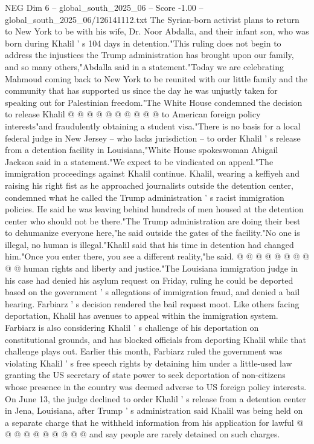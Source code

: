 \begin{textsample}{NEG Dim 6 – global\_south\_2025\_06 – Score -1.00 – global\_south\_2025\_06/126141112.txt}
The Syrian-born activist plans to return to New York to be with his wife, Dr.
Noor Abdalla, and their infant son, who was born during Khalil ' s 104 days in detention."This ruling does not begin to address the injustices the Trump administration has brought upon our family, and so many others,"Abdalla said in a statement."Today we are celebrating Mahmoud coming back to New York to be reunited with our little family and the community that has supported us since the day he was unjustly taken for speaking out for Palestinian freedom."The White House condemned the decision to release Khalil @ @ @ @ @ @ @ @ @ @ to American foreign policy interests"and fraudulently obtaining a student visa."There is no basis for a local federal judge in New Jersey -- who lacks jurisdiction -- to order Khalil ' s release from a detention facility in Louisiana,"White House spokeswoman Abigail Jackson said in a statement."We expect to be vindicated on appeal."The immigration proceedings against Khalil continue.
Khalil, wearing a keffiyeh and raising his right fist as he approached journalists outside the detention center, condemned what he called the Trump administration ' s racist immigration policies.
He said he was leaving behind hundreds of men housed at the detention center who should not be there."The Trump administration are doing their best to dehumanize everyone here,"he said outside the gates of the facility."No one is illegal, no human is illegal."Khalil said that his time in detention had changed him."Once you enter there, you see a different reality,"he said. @ @ @ @ @ @ @ @ @ @ human rights and liberty and justice."The Louisiana immigration judge in his case had denied his asylum request on Friday, ruling he could be deported based on the government ' s allegations of immigration fraud, and denied a bail hearing.
Farbiarz ' s decision rendered the bail request moot.
Like others facing deportation, Khalil has avenues to appeal within the immigration system.
Farbiarz is also considering Khalil ' s challenge of his deportation on constitutional grounds, and has blocked officials from deporting Khalil while that challenge plays out.
Earlier this month, Farbiarz ruled the government was violating Khalil ' s free speech rights by detaining him under a little-used law granting the US secretary of state power to seek deportation of non-citizens whose presence in the country was deemed adverse to US foreign policy interests.
On June 13, the judge declined to order Khalil ' s release from a detention center in Jena, Louisiana, after Trump ' s administration said Khalil was being held on a separate charge that he withheld information from his application for lawful @ @ @ @ @ @ @ @ @ @ and say people are rarely detained on such charges.

\end{textsample}
